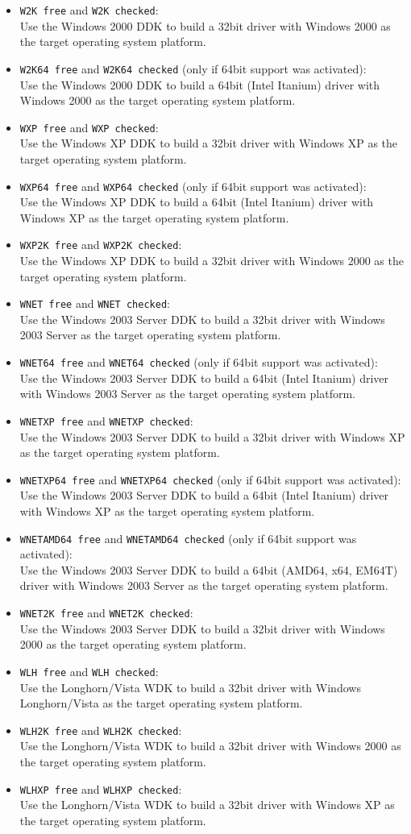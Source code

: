 \documentclass[a4paper,titlepage]{report}
\newcommand{\solcfg}[2]{\texttt{#1 free} and \texttt{#1 checked}:\\#2}
\newcommand{\solcfgsixfour}[2]{\texttt{#1 free} and \texttt{#1 checked} \textcolor[gray]{0.40}{\textsf{\small(only if 64bit support was activated)}}:\\#2}
\begin{document}
\begin{itemize}
  \item \solcfg{W2K}{Use the Windows 2000 DDK to build a 32bit driver with Windows 2000 as the target operating system platform.}
  \item \solcfgsixfour{W2K64}{Use the Windows 2000 DDK to build a 64bit (Intel Itanium) driver with Windows 2000 as the target operating system platform.}
  \item \solcfg{WXP}{Use the Windows XP DDK to build a 32bit driver with Windows XP as the target operating system platform.}
  \item \solcfgsixfour{WXP64}{Use the Windows XP DDK to build a 64bit (Intel Itanium) driver with Windows XP as the target operating system platform.}
  \item \solcfg{WXP2K}{Use the Windows XP DDK to build a 32bit driver with Windows 2000 as the target operating system platform.}
  \item \solcfg{WNET}{Use the Windows 2003 Server DDK to build a 32bit driver with Windows 2003 Server as the target operating system platform.}
  \item \solcfgsixfour{WNET64}{Use the Windows 2003 Server DDK to build a 64bit (Intel Itanium) driver with Windows 2003 Server as the target operating system platform.}
  \item \solcfg{WNETXP}{Use the Windows 2003 Server DDK to build a 32bit driver with Windows XP as the target operating system platform.}
  \item \solcfgsixfour{WNETXP64}{Use the Windows 2003 Server DDK to build a 64bit (Intel Itanium) driver with Windows XP as the target operating system platform.}
  \item \solcfgsixfour{WNETAMD64}{Use the Windows 2003 Server DDK to build a 64bit (AMD64, x64, EM64T) driver with Windows 2003 Server as the target operating system platform.}
  \item \solcfg{WNET2K}{Use the Windows 2003 Server DDK to build a 32bit driver with Windows 2000 as the target operating system platform.}
  \item \solcfg{WLH}{Use the Longhorn/Vista WDK to build a 32bit driver with Windows Longhorn/Vista as the target operating system platform.}
  \item \solcfg{WLH2K}{Use the Longhorn/Vista WDK to build a 32bit driver with Windows 2000 as the target operating system platform.}
  \item \solcfg{WLHXP}{Use the Longhorn/Vista WDK to build a 32bit driver with Windows XP as the target operating system platform.}

\end{itemize}
\end{document}
